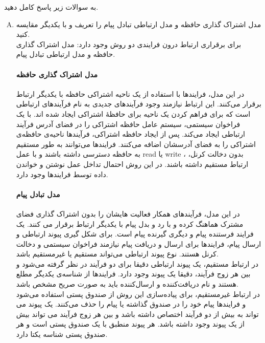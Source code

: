 \documentclass[]{article}
\begin{document}
به سوالات زیر پاسخ کامل دهید.
\vspace{0.2cm}
\begin{enumerate}[(A)]
    \item ﻣﺪﻝ ﺍﺷﺘﺮﺍﮎ ﮔﺬﺍﺭﯼ ﺣﺎﻓﻈﻪ ﻭ ﻣﺪﻝ ﺍﺭﺗﺒﺎﻃﯽ ﺗﺒﺎﺩﻝ ﭘﯿﺎﻡ ﺭﺍ ﺗﻌﺮﯾﻒ ﻭ ﺑﺎ ﯾﮑﺪﯾﮕﺮ ﻣﻘﺎﯾﺴﻪ ﮐﻨﯿﺪ.
          \\
          برای برقراری ارتباط درون فرایندی دو روش وجود دارد: مدل اشتراک گذاری حافظه و مدل ارتباطی تبادل پیام.
          \vspace{-0.25cm}
          \paragraph*{مدل اشتراک گذاری حافظه}
          در این مدل، فرایندها با استفاده از یک ناحیه اشتراکی حافظه با یکدیگر ارتباط برقرار می‌کنند.
          این ارتباط نیازمند وجود فرآیندهای جدیدی به نام فرآیندهای ارتباطی است که برای فراهم کردن یک ناحیه برای حافظۀ اشتراکی ایجاد شده اند.
          با یک فراخوان سیستمی، سیستم عامل حافظه اشتراکی را در فضای آدرس فرآیند ارتباطی ایجاد می‌کند.
          پس از ایجاد حافظه اشتراکی، فرآیندها ناحیه‌ی حافظه‌ی اشتراکی را به فضای آدرسشان اضافه می‌کنند.
          فرایندها می‌توانند به طور مستقیم به حافظه دسترسی داشته باشند و با عمل read یا write ، بدون دخالت کرنل، ارتباط مستقیم داشته باشند.
          در این روش احتمال تداخل عمل نوشتن و خواندن داده توسط فرایندها وجود دارد.
          \vspace{-0.25cm}
          \paragraph*{مدل تبادل پیام}
          در این مدل، فرآیندهای همکار فعالیت هایشان را بدون اشتراک گذاری فضای مشترک هماهنگ کرده و با رد و بدل پیام با یکدیگر ارتباط برقرار می کنند.
          یک فرایند فرستنده پیام و دیگری گیرنده پیام است. برای شکل گیری پیوند ارتباطی و ارسال پیام، فرایندها برای ارسال و دریافت پیام نیازمند فراخوان سیستمی و دخالت کرنل هستند.
          نوع پیوند ارتباطی می‌تواند مستقیم یا غیرمستقیم باشد.
          \\
          در ارتباط مستقیم، یک پیوند ارتباطی دقیقا برای دو فرآیند در نظر گرفته می‌شود و بین هر زوج فرآیند، دقیقا یک پیوند وجود دارد.
          فرایندها از شناسه‌ی یکدیگر مطلع هستند و نام دریافت‌کننده و ارسال‌کننده باید به صورت صریح مشخص باشد.
          \\
          در ارتباط غیرمستقیم، برای پیاده‌سازی این روش از صندوق پستی استفاده می‌شود و فرایندها پیام خود را در صندوق گذاشته یا پیام را حذف می‌کنند.
          یک پیوند می تواند به بیش از دو فرآیند اختصاص داشته باشد و بین هر زوج فرآیند می تواند بیش از یک پیوند وجود داشته باشد.
          هر پیوند منطبق با یک صندوق پستی است و هر صندوق پستی شناسه یکتا دارد.
          \vspace{-0.25cm}

\end{enumerate}
\end{document}
